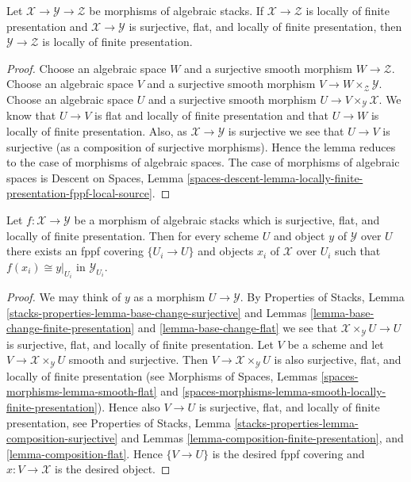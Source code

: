 \begin{lemma}
\label{lemma-flat-finite-presentation-permanence}
Let $\mathcal{X} \to \mathcal{Y} \to \mathcal{Z}$ be morphisms of
algebraic stacks. If $\mathcal{X} \to \mathcal{Z}$ is locally of finite
presentation and $\mathcal{X} \to \mathcal{Y}$ is surjective, flat, and
locally of finite presentation, then $\mathcal{Y} \to \mathcal{Z}$
is locally of finite presentation.
\end{lemma}

\begin{proof}
Choose an algebraic space $W$ and a surjective smooth morphism
$W \to \mathcal{Z}$. Choose an algebraic space $V$ and a surjective smooth
morphism $V \to W \times_\mathcal{Z} \mathcal{Y}$. Choose an algebraic space
$U$ and a surjective smooth morphism $U \to V \times_\mathcal{Y} \mathcal{X}$.
We know that $U \to V$ is flat and locally of finite presentation
and that $U \to W$ is locally of finite presentation.
Also, as $\mathcal{X} \to \mathcal{Y}$ is surjective we see that
$U \to V$ is surjective (as a composition of surjective morphisms).
Hence the lemma reduces to the case of morphisms of algebraic spaces.
The case of morphisms of algebraic spaces is
Descent on Spaces, Lemma
\ref{spaces-descent-lemma-locally-finite-presentation-fppf-local-source}.
\end{proof}

\begin{lemma}
\label{lemma-surjective-flat-locally-finite-presentation}
Let $f : \mathcal{X} \to \mathcal{Y}$ be a morphism of algebraic stacks
which is surjective, flat, and locally of finite presentation.
Then for every scheme $U$ and object $y$ of $\mathcal{Y}$ over $U$
there exists an fppf covering $\{U_i \to U\}$ and objects $x_i$
of $\mathcal{X}$ over $U_i$ such that $f(x_i) \cong y|_{U_i}$ in
$\mathcal{Y}_{U_i}$.
\end{lemma}

\begin{proof}
We may think of $y$ as a morphism $U \to \mathcal{Y}$. By
Properties of Stacks, Lemma
\ref{stacks-properties-lemma-base-change-surjective}
and
Lemmas \ref{lemma-base-change-finite-presentation} and
\ref{lemma-base-change-flat}
we see that $\mathcal{X} \times_\mathcal{Y} U \to U$ is surjective, flat,
and locally of finite presentation. Let $V$ be a scheme and let
$V \to \mathcal{X} \times_\mathcal{Y} U$ smooth and surjective.
Then $V \to \mathcal{X} \times_\mathcal{Y} U$ is also surjective, flat, and
locally of finite presentation (see
Morphisms of Spaces, Lemmas
\ref{spaces-morphisms-lemma-smooth-flat} and
\ref{spaces-morphisms-lemma-smooth-locally-finite-presentation}).
Hence also $V \to U$ is surjective, flat, and
locally of finite presentation, see
Properties of Stacks, Lemma
\ref{stacks-properties-lemma-composition-surjective}
and
Lemmas \ref{lemma-composition-finite-presentation}, and
\ref{lemma-composition-flat}.
Hence $\{V \to U\}$ is the desired fppf covering and $x : V \to \mathcal{X}$
is the desired object.
\end{proof}

